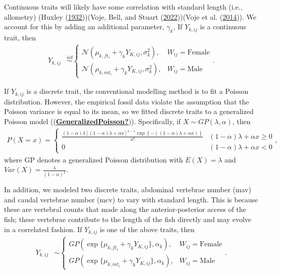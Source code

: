 \documentclass[
  12pt,
]{article}
\begin{document}
Continuous traits will likely have some correlation with standard length
(i.e., allometry) (Huxley
(\protect\hyperlink{ref-Huxley1932}{1932}))(Voje, Bell, and Stuart
(\protect\hyperlink{ref-Vojeetal2022}{2022}))(Voje et al.
(\protect\hyperlink{ref-Vojeetal2014}{2014})). We account for this by
adding an additional parameter, \(\gamma_k\), If \(Y_{k,ij}\) is a
continuous trait, then \begin{align}
{Y}_{k,ij} & \overset{iid}{\sim}\left\{\begin{array}{llll} \mathcal{N}(\mu_{k,ft_i} + \gamma_kY_{K,ij},\sigma_k^2), & W_{ij} = \text{Female} \\ \mathcal{N}(\mu_{k,mt_i} + \gamma_kY_{K,ij},\sigma_k^2), & W_{ij} = \text{Male} \end{array}\right..
\label{eq:cont}
\end{align}

If \(Y_{k,ij}\) is a discrete trait, the conventional modelling method
is to fit a Poisson distribution. However, the empirical fossil data
violate the assumption that the Poisson variance is equal to its mean,
so we fitted discrete traits to a generalized Poisson model
((\protect\hyperlink{ref-GeneralizedPoisson}{\textbf{GeneralizedPoisson?}})).
Specifically, if \(X \sim GP(\lambda,\alpha)\), then \begin{align}
P(X = x) = \left\{\begin{array}{cc} \frac{(1 - \alpha)\lambda[(1 - \alpha)\lambda + \alpha x]^{x - 1} \exp\left\{-((1 - \alpha)\lambda  + \alpha x)\right\}}{x!} & (1 - \alpha)\lambda  + \alpha x \geq 0  \\ 0 & (1 - \alpha)\lambda  + \alpha x < 0 \end{array}\right.,
\label{eq:GP_pmf}
\end{align} where GP denotes a generalized Poisson distribution with
\(E(X) = \lambda\) and \(Var(X) = \frac{\lambda}{(1 - \alpha)^2}\).

In addition, we modeled two discrete traits, abdominal vertebrae number
(mav) and caudal vertebrae number (mcv) to vary with standard length.
This is because these are vertebral counts that made along the
anterior-posterior access of the fish; these vertebrae contribute to the
length of the fish directly and may evolve in a correlated fashion. If
\(Y_{k,ij}\) is one of the above traits, then \begin{align}
{Y}_{k,ij} & \sim \left\{\begin{array}{ll} GP(\exp\{\mu_{k,ft_i} + \gamma_kY_{K,ij}\},\alpha_k), & W_{ij} = \text{Female} \\ GP(\exp\{\mu_{k,mt_i} + \gamma_kY_{K,ij}\},\alpha_k), & W_{ij} = \text{Male} \end{array}\right..
\label{eq:disc_corr}
\end{align}
\end{document}
